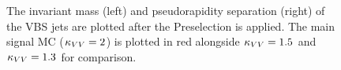 \begin{figure}[htb]
    \centering
    \qquad
    \caption{
        The invariant mass \Mjj (left) and pseudorapidity separation \detajj (right) of the VBS jets are plotted after the Preselection is applied. 
        The main signal MC ($\kappa_{VV} = 2$) is plotted in red alongside $\kappa_{VV} = 1.5$ and $\kappa_{VV} = 1.3$ for comparison. 
    }
    \label{fig:vbsvvh_vbs_vars}
\end{figure}

